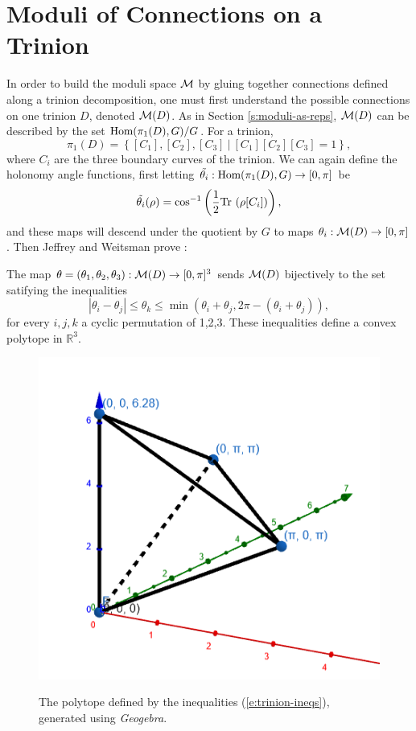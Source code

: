 \section{Moduli of Connections on a Trinion}
	In order to build the moduli space $\mathcal{M}$ by gluing together connections defined along a trinion decomposition, one must first understand the possible connections on one trinion $D$, denoted $\mathcal{M}(D)$. As in Section \ref{s:moduli-as-reps}, $\mathcal{M}(D)$ can be described by the set $\text{Hom}(\pi_1(D),G)/G$. For a trinion, 
	\begin{equation}
		\pi_1(D) = \left\{
		[C_1], [C_2], [C_3] ~|~ [C_1][C_2][C_3]  =1
		\right\},
	\end{equation}
	where $C_i$ are the three boundary curves of the trinion. We can again define the holonomy angle functions, first letting $\tilde{\theta_i}:\text{Hom}(\pi_1(D),G) \to [0,\pi]$ be
	\begin{equation}
		\label{e:thetacoords}
		\tilde{\theta_i}(\rho) = \cos^{-1}\left(\frac{1}{2}\text{Tr }(\rho[C_i])\right),
	\end{equation}
	and these maps will descend under the quotient by $G$ to maps $\theta_i:\mathcal{M}(D)\to [0,\pi]$. Then Jeffrey and Weitsman prove \cite[Proposition 3.1]{jeffrey_bohr-sommerfeld_1992}:
	\begin{theorem}[]
		The map $\theta = (\theta_1, \theta_2, \theta_3):\mathcal{M}(D)\to[0,\pi]^3$ sends $\mathcal{M}(D)$ bijectively to the set satifying the inequalities
		\begin{equation}
			|\theta_i - \theta_j| \leq \theta_k \leq \min(\theta_i + \theta_j, 2\pi - (\theta_i + \theta_j)),
			\label{e:trinion-ineqs}
		\end{equation}
		for every $i,j,k$ a cyclic permutation of 1,2,3. These inequalities define a convex polytope in $\mathbb{R}^3$.
	\end{theorem}

	\begin{figure}[h]
	\centering
	\includegraphics[width=0.5\linewidth]{polytope.png}\label{fig:polytope}
	\caption{The polytope defined by the inequalities (\ref{e:trinion-ineqs}), generated using \emph{Geogebra}.}
	\end{figure}

